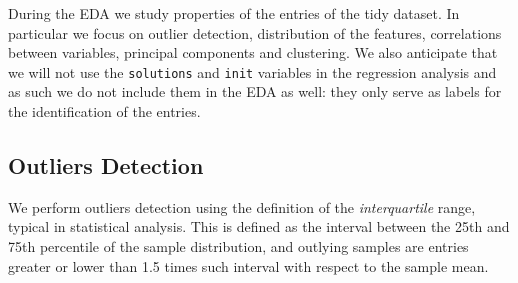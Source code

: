 During the EDA we study properties of the entries of the tidy dataset.
In particular we focus on outlier detection, distribution of the features,
correlations between variables, principal components and clustering.
We also anticipate that we will not use the \texttt{solutions} and
\texttt{init} variables in the regression analysis and as such we do not
include them in the EDA as well: they only serve as labels for the
identification of the entries.

\subsection{Outliers Detection}\label{sec:eda:outliers}

We perform outliers detection using the definition of the
\textit{interquartile} range, typical in statistical analysis.
This is defined as the interval between the 25th and 75th percentile of the
sample distribution, and outlying samples are entries greater or lower than 1.5
times such interval with respect to the sample mean.

